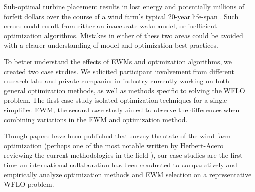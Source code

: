 Sub-optimal turbine placement results in lost energy and potentially millions of forfeit dollars over the course of a wind farm's typical 20-year life-span \cite{HerbertAcero2014}. Such errors could result from either an inaccurate wake model, or inefficient optimization algorithms. Mistakes in either of these two areas could be avoided with a clearer understanding of model and optimization best practices.

To better understand the effects of EWMs and optimization algorithms, we created two case studies.
We solicited participant involvement from different research labs and private companies in industry currently working on both general optimization methods, as well as methods specific to solving the WFLO problem.
The first case study isolated optimization techniques for a single simplified EWM; the second case study aimed to observe the differences when combining variations in the EWM and optimization method.

Though papers have been published that survey the state of the wind farm optimization (perhaps one of the most notable written by Herbert-Acero reviewing the current methodologies in the field \cite{HerbertAcero2014}),
our case studies are the first time an international collaboration has been conducted to comparatively and empirically analyze optimization methods and EWM selection on a representative WFLO problem.%



